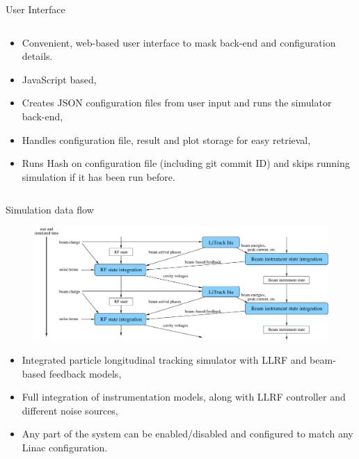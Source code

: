 \documentclass[final]{beamer}
\begin{document}
\begin{frame}{}
\begin{block}{User Interface}
\begin{columns}
		    \begin{column}{0.3\textwidth}
	          \begin{itemize}
	            \item Convenient, web-based user interface to mask back-end and configuration details.
		     \item JavaScript based,
		     \item Creates JSON configuration files from user input and runs the simulator back-end,
		     \item Handles configuration file, result and plot storage for easy retrieval,
		     \item Runs Hash on configuration file (including git commit ID) and skips running simulation if it has been run before.
		    \end{itemize}
		    \end{column}
		  \end{columns}
		\end{block}
    \begin{columns}[t]
      \begin{column}{.47\textwidth}
        \begin{block}{Simulation data flow}
	\begin{figure}
	  \centering
	  \includegraphics[width=\textwidth]{model_do2.eps}
	\end{figure}
	\begin{itemize}
	 \item Integrated particle longitudinal tracking simulator with LLRF and beam-based feedback models,
	 \item Full integration of instrumentation models, along with LLRF controller and different noise sources,
	 \item Any part of the system can be enabled/disabled and configured to match any Linac configuration.
	\end{itemize}



\end{block}
\end{column}
\end{columns}
\end{frame}
\end{document}
